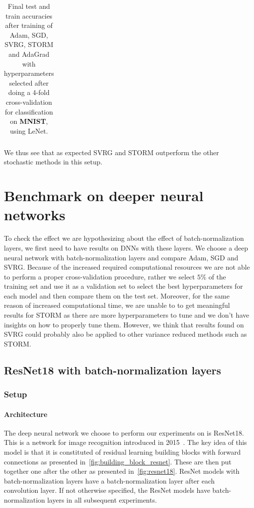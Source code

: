 \documentclass[a4paper,11pt,oneside]{report}
\begin{document}
\begin{table}[h]
    \begin{center}
        \begin{tabular}{||c | c | c||}
             \hline
             
        \end{tabular}
    \end{center}
    \caption{Final test and train accuracies after training of Adam, SGD, SVRG, STORM and AdaGrad with hyperparameters selected after doing a 4-fold cross-validation for classification on \textbf{MNIST}, using LeNet.}
    \label{tab:MNISTacc}
\end{table}


We thus see that as expected SVRG and STORM outperform the other stochastic methods in this setup.


\section{Benchmark on deeper neural networks}
To check the effect we are hypothesizing about the effect of batch-normalization layers, we first need to have results on DNNs with these layers. We choose a deep neural network with batch-normalization layers and compare Adam, SGD and SVRG. Because of the increased required computational resources we are not able to perform a proper cross-validation procedure, rather we select $5\%$ of the training set and use it as a validation set to select the best hyperparameters for each model and then compare them on the test set. Moreover, for the same reason of increased computational time, we are unable to to get meaningful results for STORM as there are more hyperparameters to tune and we don't have insights on how to properly tune them. However, we think that results found on SVRG could probably also be applied to other variance reduced methods such as STORM.


\subsection{ResNet18 with batch-normalization layers}

\subsubsection{Setup}
\paragraph{Architecture}
The deep neural network we choose to perform our experiments on is ResNet18. This is a network for image recognition introduced in 2015~\citep{he2015deep}. The key idea of this model is that it is constituted of residual learning building blocks with forward connections as presented in~\autoref{fig:building_block_resnet}. These are then put together one after the other as presented in~\autoref{fig:resnet18}. ResNet models with batch-normalization layers have a batch-normalization layer after each convolution layer. If not otherwise specified, the ResNet models have batch-normalization layers in all subsequent experiments.
\end{document}
